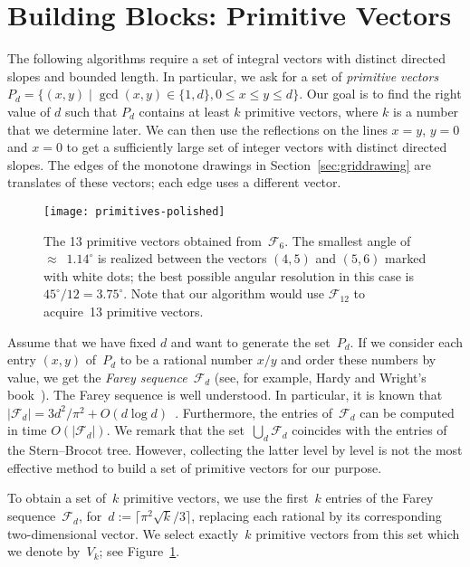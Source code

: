 \documentclass[a4paper,11pt]{article}
\theoremstyle{plain}
\begin{document}
\section{Building Blocks: Primitive Vectors}
\label{sec:primitive}

The following algorithms require a set of integral vectors with distinct 
directed slopes and bounded length. In particular, we ask for a set of 
\emph{primitive vectors} $P_{d}=\{ (x,y) \mid \gcd(x,y) \in\{1,d\}, 0 \le x \le y \le d \}$.
Our goal is to find the right value of $d$ such that $P_{d}$ contains
at least $k$ primitive vectors, where $k$ is a number that we determine later. 
We can then use the reflections on the lines $x=y$, $y=0$ and $x=0$ to
get a sufficiently large set of integer vectors with  distinct
directed slopes.  The edges of the monotone drawings in
Section~\ref{sec:griddrawing} are translates of these vectors; each edge 
uses a different vector. 

\begin{figure}[tb]
  \centering
  \texttt{[image: primitives-polished]}
  \caption{The 13 primitive vectors obtained from~$\mathcal{F}_6$. The
    smallest angle of~$\approx$~$1.14^\circ$ is realized between the
    vectors $(4,5)$ and $(5,6)$ marked with white dots; the best
    possible angular resolution in this case is $45^\circ/12 =
    3.75^\circ$. Note that our algorithm would use $\mathcal{F}_{12}$ to
    acquire~13 primitive vectors.}
  \label{fig:primitive}
\end{figure}

Assume that we have fixed $d$ and want to generate the set~$P_d$. If we
consider each entry $(x,y)$ of~$P_d$ to be a rational number $x/y$ and
order these numbers by value, we get the \emph{Farey sequence}~$\mathcal{F}_d$ 
(see, for example, Hardy and Wright's book~\cite{gw-itn-79}). 
The Farey sequence is well understood. In particular, it is known that
$|\mathcal{F}_d| = 3d^2/\pi^2 + O(d \log d)$~\cite[Theorem~331]{gw-itn-79}. 
Furthermore, the entries of~$\mathcal{F}_d$ can 
be computed in time $O(|\mathcal{F}_d|)$.  We remark that the set~$\bigcup_d \mathcal{F}_d$ coincides with the entries of the
Stern--Brocot tree.  However, collecting the latter level by level is
not the most effective method to build a set of primitive vectors for
our purpose. 

To obtain a set of~$k$ primitive vectors, we use the first~$k$
entries of the Farey sequence~$\mathcal{F}_d$, for~$d:= \lceil 
\pi^2 \sqrt k/3  \rceil$, 
replacing each rational by its corresponding two-dimensional vector.  
We select exactly~$k$ primitive vectors from this set which we denote by~$V_k$;
see Figure~\ref{fig:primitive}.
\end{document}
